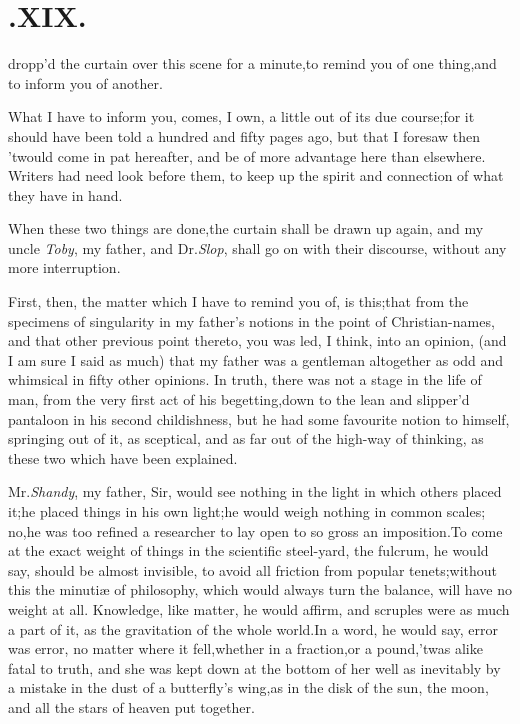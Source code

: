 \documentclass{article}
\begin{document}
\bigskip

\section{.\enspace  XIX.}

 dropp’d the curtain over this\break
scene for a minute,\tsk to remind you of one
thing,\tsk and to inform you of an\-other.

What I have to inform you, comes, I own, a little out of its due
course;\tsh for it should have been told a hundred and
fifty pages ago, but that I foresaw then ’twould come in pat hereafter, and be of
more advantage here than elsewhere.\tsh\break
Writers had need look before them, to keep up the spirit and
connection of what they have in hand.

When these two things are done,\tsk the curtain shall be drawn
up again, and my uncle \textit{Toby}, my father, and Dr.\@ \textit{Slop},
shall go on with their discourse, without any more
interruption.

First, then, the matter which I have to remind you of, is
this;\tsh that from the specimens of singularity in my
father’s notions in the point of Christian-names, and that
other previous point thereto,\tsk\break
you was led, I think, into an opinion,
(and I am sure I said as much) that my father was a
gentleman altogether as odd
and whimsical in fifty other opinions.
In truth, there was not a stage in the life of man, from the very
first act of his be\-getting,\tsh down to the lean and
slipper’d pantaloon in his second childishness, but he had some
favourite notion to himself, springing out of it, as sceptical, and
as far out of the high-way of thinking, as these two which have been
explained.

\tsk Mr.\@ \textit{Shandy}, my father, Sir, would see nothing in
the light in which others placed it;\tsk he placed things in his
own light;\tsk he would weigh nothing in common scales;\tsk
no,\tsk he was too refined a researcher to lay open to so gross an
imposition.\tsk To come at the exact weight of things in the
scientific steel-yard, the fulcrum, he would say, should be almost
invisible, to avoid all friction from popular tenets;\tsk without
this the minutiæ of philosophy, which would always turn the
balance, will have no weight at all.\tsk\break
Knowledge, like matter, he would affirm,
and scruples were as much a part of it, as the gravitation of the whole world.\tsk In
a word, he would say, error was error,\tsk\break
no matter where it fell,\tsh whether in a fraction,\tsh or a pound,\tsk ’twas alike
fatal to truth, and she was kept down at the bottom of her well
as inevitably by a mistake in the dust of a butterfly’s
wing,\break\tsk as in the disk of the sun, the moon, and all the stars
of heaven put together.
\end{document}
